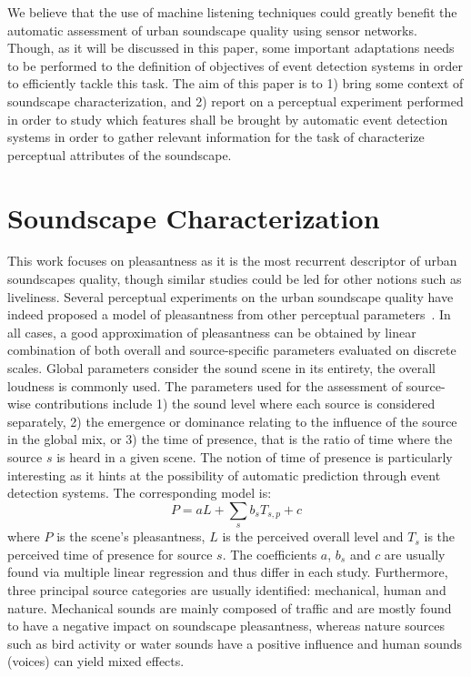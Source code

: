 \documentclass{article}
\begin{document}
\begin{sloppy}
We believe that the use of machine listening techniques could greatly benefit the automatic assessment of urban soundscape quality using sensor networks. Though, as it will be discussed in this paper, some important adaptations needs to be performed to the definition of objectives of event detection systems in order to efficiently tackle this task. The aim of this paper is to 1) bring some context of soundscape characterization, and 2) report on a perceptual experiment performed in order to study which features shall be brought by automatic event detection systems in order to gather relevant information for the task of characterize perceptual attributes of the soundscape.


\section{Soundscape Characterization}
\label{sec:char}
This work focuses on pleasantness as it is the most recurrent descriptor of urban soundscapes quality, though similar studies could be led for other notions such as liveliness. Several perceptual experiments on the urban soundscape quality have indeed proposed a model of pleasantness from other perceptual parameters~\cite{nilsson2007, axelsson2010, aumond2017, ricciardi2014}. In all cases, a good approximation of pleasantness can be obtained by linear combination of both overall and source-specific parameters evaluated on discrete scales. Global parameters consider the sound scene in its entirety, the overall loudness is commonly used. The parameters used for the assessment of source-wise contributions include 1) the sound level where each source is considered separately, 2) the emergence or dominance relating to the influence of the source in the global mix, or 3) the time of presence, that is the ratio of time where the source $s$ is heard in a given scene. The notion of time of presence is particularly interesting as it hints at the possibility of automatic prediction through event detection systems. The corresponding model is:
\begin{equation}
P = aL + \sum_s b_sT_{s,p} + c
\end{equation}
where $P$ is the scene's pleasantness, $L$ is the perceived overall level and $T_s$ is the perceived time of presence for source $s$. The coefficients $a$, $b_s$ and $c$ are usually found via multiple linear regression and thus differ in each study.
Furthermore, three principal source categories are usually identified: mechanical, human and nature. Mechanical sounds are mainly composed of traffic and are mostly found to have a negative impact on soundscape pleasantness, whereas nature sources such as bird activity or water sounds have a positive influence and human sounds (voices) can yield mixed effects.


\end{sloppy}
\end{document}
